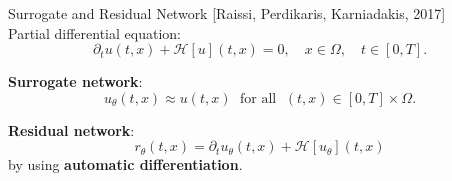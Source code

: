 \documentclass[9pt]{beamer}
\begin{document}
\begin{frame}{Surrogate and Residual Network}
    \vspace{-1\baselineskip}\hfill{\tiny{[Raissi, Perdikaris, Karniadakis, 2017]}} \\
    Partial differential equation: \\
    \begin{equation*}
        \partial_t u\left(t,x\right) + \mathcal{H} \left[ u \right] \left(t, x\right) = 0, \quad x \in \Omega, \quad t \in \left[ 0, T \right].
    \end{equation*}

    \vspace{5mm}

    \textbf{Surrogate network}: \\
    \begin{equation*}
        u_\theta \left(t, x \right) \approx u\left(t,x\right) \; \text{ for all } \; \left(t, x \right) \in \left[ 0, T \right] \times \Omega.
    \end{equation*}
    
    \vspace{5mm}

    \textbf{Residual network}: \\
    \begin{equation*}
        r_{\theta} \left(t,x\right) = \partial_t u_{\theta} \left(t,x\right) + \mathcal{H} \left[ u_{\theta} \right] \left(t, x\right)
    \end{equation*}
    by using \textbf{automatic differentiation}.

\end{frame}
\end{document}
